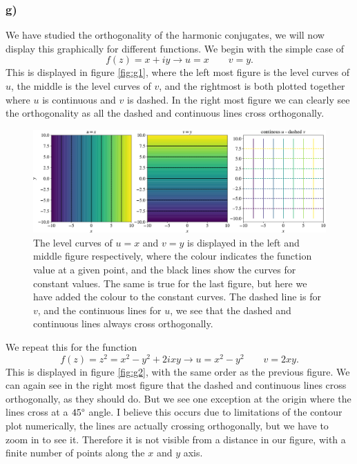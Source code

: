 \documentclass[12pt,twoside]{article}
\begin{document}
\subsubsection*{g)}
We have studied the orthogonality of the harmonic conjugates, we will now display this graphically for different functions. We begin with the simple case of
\begin{equation}
  f(z) = x+iy \rightarrow u=x\qquad v=y.
\end{equation}
This is displayed in figure \vref{fig:g1}, where the left most figure is the level curves of $u$, the middle is the level curves of $v$, and the rightmost is both plotted together where $u$ is continuous and $v$ is dashed. In the right most figure we can clearly see the orthogonality as all the dashed and continuous lines cross orthogonally. \par
\begin{figure}
  \centering
  \includegraphics[width=\textwidth]{../figures/first.pdf}
  \caption{The level curves of $u=x$ and $v=y$ is displayed in the left and middle figure respectively, where the colour indicates the function value at a given point, and the black lines show the curves for constant values. The same is true for the last figure, but here we have added the colour to the constant curves. The dashed line is for $v$, and the continuous lines for $u$, we see that the dashed and continuous lines always cross orthogonally.}
  \label{fig:g1}
\end{figure}
We repeat this for the function
\begin{equation}
  f(z) = z^2 = x^2-y^2+2ixy \rightarrow u=x^2-y^2\qquad v=2xy.
\end{equation}
This is displayed in figure \vref{fig:g2}, with the same order as the previous figure. We can again see in the right most figure that the dashed and continuous lines cross orthogonally, as they should do. But we see one exception at the origin where the lines cross at a $45\degree$ angle. I believe this occurs due to limitations of the contour plot numerically, the lines are actually crossing orthogonally, but we have to zoom in to see it. Therefore it is not visible from a distance in our figure, with a finite number of points along the $x$ and $y$ axis.\par
\end{document}
